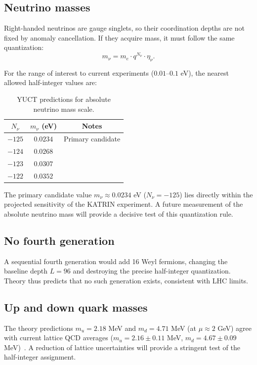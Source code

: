 \documentclass[12pt,a4paper]{article}
\begin{document}
\subsection{Neutrino masses}

Right-handed neutrinos are gauge singlets, so their coordination depths are not fixed by anomaly cancellation. If they acquire mass, it must follow the same quantization:
\begin{equation}
	m_\nu = m_e \cdot q^{N_\nu} \cdot \eta_\nu.
\end{equation}

For the range of interest to current experiments ($0.01$--$0.1$ eV), the nearest allowed half-integer values are:

\begin{table}[htbp]
	\centering
	\caption{YUCT predictions for absolute neutrino mass scale.}
	\label{tab:neutrino}
	\begin{tabular}{c c c}
		\toprule
		$N_\nu$ & $m_\nu$ (eV) & Notes \\
		\midrule
		$-125$ & $0.0234$ & Primary candidate \\
		$-124$ & $0.0268$ & \\
		$-123$ & $0.0307$ & \\
		$-122$ & $0.0352$ & \\
		\bottomrule
	\end{tabular}
\end{table}

The primary candidate value $m_\nu \approx 0.0234$ eV ($N_\nu = -125$) lies directly within the projected sensitivity of the KATRIN experiment. A future measurement of the absolute neutrino mass will provide a decisive test of this quantization rule.
	
	
	
	\subsection{No fourth generation}
	
	A sequential fourth generation would add 16 Weyl fermions, changing the baseline depth $L=96$ and destroying the precise half-integer quantization. Theory thus predicts that no such generation exists, consistent with LHC limits.
	
	\subsection{Up and down quark masses}
	
	The theory predictions $m_u = 2.18$ MeV and $m_d = 4.71$ MeV (at $\mu \approx 2$ GeV) agree with current lattice QCD averages ($m_u = 2.16 \pm 0.11$ MeV, $m_d = 4.67 \pm 0.09$ MeV)~\cite{PDG2024}. A reduction of lattice uncertainties will provide a stringent test of the half-integer assignment.
	
\end{document}
